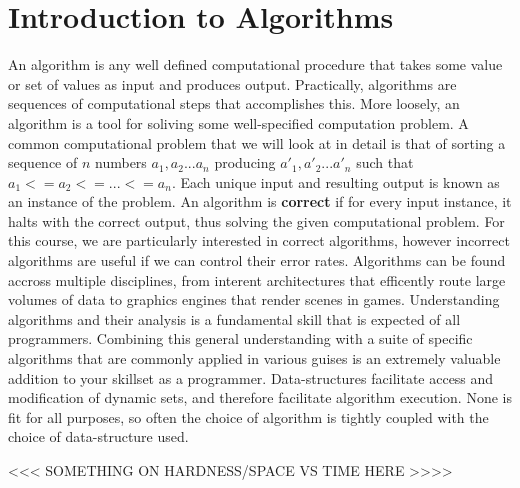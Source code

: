 \documentclass[10pt,a4paper]{article}
\begin{document}
\section{Introduction to Algorithms}
An algorithm is any well defined computational procedure that takes some value or set of values as input and produces output. Practically, algorithms are sequences of computational steps that accomplishes this. More loosely, an algorithm is a tool for soliving some well-specified computation problem. A common computational problem that we will look at in detail is that of sorting a sequence of $n$ numbers $a_1,a_2...a_n$ producing $a'_1,a'_2...a'_n$ such that $a_1 <= a_2 <= ... <= a_n$. Each unique input and resulting output is known as an instance of the problem. 
\newline\newline
An algorithm is {\bf correct} if for every input instance, it halts with the correct output, thus solving the given computational problem. For this course, we are particularly interested in correct algorithms, however incorrect algorithms are useful if we can control their error rates. 
\newline\newline
Algorithms can be found accross multiple disciplines, from interent architectures that efficently route large volumes of data to graphics engines that render scenes in games. Understanding algorithms and their analysis is a fundamental skill that is expected of all programmers. Combining this general understanding with a suite of specific algorithms that are commonly applied in various guises is an extremely valuable addition to your skillset as a programmer. 
\newline\newline
Data-structures facilitate access and modification of dynamic sets, and therefore facilitate algorithm execution. None is fit for all purposes, so often the choice of algorithm is tightly coupled with the choice of data-structure used. 


<<< SOMETHING ON HARDNESS/SPACE VS TIME HERE >>>>
\end{document}
